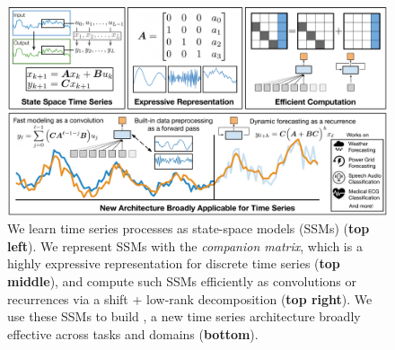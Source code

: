 


\begin{figure}[!t]
  \centering
  \includegraphics[width=1\textwidth]{_ICLR2023_paper/figures/time_series_ssm_use_this_2_levels_refactor1.pdf}
 \caption{We learn time series processes as state-space models (SSMs) (\textbf{top left}). We represent SSMs with the \textit{companion matrix}, which is a highly expressive representation for discrete time series  (\textbf{top middle}), and compute such SSMs efficiently as convolutions or recurrences via a shift + low-rank decomposition (\textbf{top right}). We use these SSMs to build \ourmethod{}, a new time series architecture broadly effective across tasks and domains (\textbf{bottom}).}
  \label{fig:overvew_fig1}
\end{figure}

